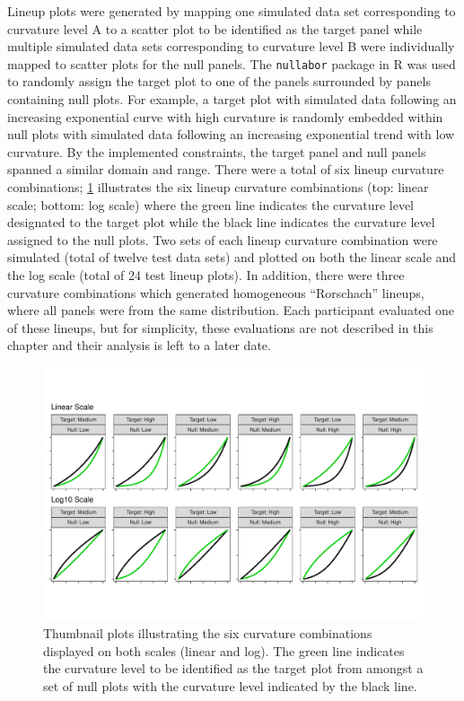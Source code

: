 \documentclass[12pt]{article}
\begin{document}
Lineup plots were generated by mapping one simulated data set
corresponding to curvature level A to a scatter plot to be identified as
the target panel while multiple simulated data sets corresponding to
curvature level B were individually mapped to scatter plots for the null
panels. The \texttt{nullabor} package in R \citep{nullabor} was used to
randomly assign the target plot to one of the panels surrounded by
panels containing null plots. For example, a target plot with simulated
data following an increasing exponential curve with high curvature is
randomly embedded within null plots with simulated data following an
increasing exponential trend with low curvature. By the implemented
constraints, the target panel and null panels spanned a similar domain
and range. There were a total of six lineup curvature combinations;
\cref{fig:curvature-combination-example} illustrates the six lineup
curvature combinations (top: linear scale; bottom: log scale) where the
green line indicates the curvature level designated to the target plot
while the black line indicates the curvature level assigned to the null
plots. Two sets of each lineup curvature combination were simulated
(total of twelve test data sets) and plotted on both the linear scale
and the log scale (total of 24 test lineup plots). In addition, there
were three curvature combinations which generated homogeneous
``Rorschach'' lineups, where all panels were from the same distribution.
Each participant evaluated one of these lineups, but for simplicity,
these evaluations are not described in this chapter and their analysis
is left to a later date.

\begin{figure}[tbp]

{\centering \includegraphics[width=1\linewidth,]{logarithmic-lineups_files/figure-latex/curvature-combination-example-1} 

}

\caption[Lineup curvature combinations]{Thumbnail plots illustrating the six curvature combinations displayed on both scales (linear and log). The green line indicates the curvature level to be identified as the target plot from amongst a set of null plots with the curvature level indicated by the black line.}\label{fig:curvature-combination-example}
\end{figure}
\end{document}
